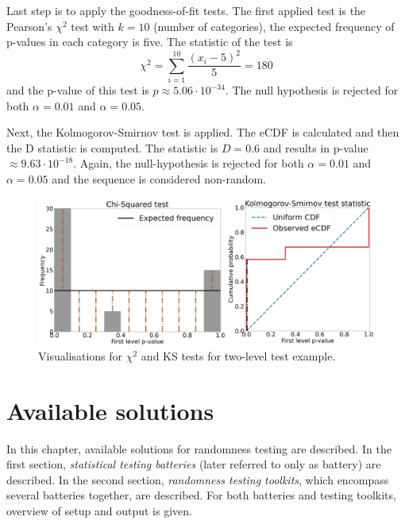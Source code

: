 \documentclass[
  digital,     %
  oneside,     %
  nosansbold,  %
  nocolorbold, %
  nolof,         %
  nolot,         %
]{fithesis4}
\begin{document}
Last step is to apply the goodness-of-fit tests. The first applied test is the Pearson's $\chi^2$ test with $k=10$ (number of categories), the expected frequency of p-values in each category is five. The statistic of the test is
\[\chi^2 = \sum_{i=1}^{10} \dfrac{(x_i - 5)^2}{5} = 180 \]
and the p-value of this test is $p\approx5.06\cdot10^{-34}$. The null hypothesis is rejected for both $\alpha = 0.01$ and $\alpha = 0.05$. 

Next, the Kolmogorov-Smirnov test is applied. The eCDF is calculated and then the D statistic is computed. The statistic is $D = 0.6$ and results in p-value $\approx 9.63\cdot10^{-18}$. Again, the null-hypothesis is rejected for both $\alpha = 0.01$ and $\alpha = 0.05$ and the sequence is considered non-random.

\begin{figure}
  \begin{center}
    \includegraphics[width=12.5cm]{figures/two_example.png}
  \end{center}
  \caption{Visualisations for $\chi^2$ and KS tests for two-level test example.}
  \label{fig:two_example}
\end{figure}



\chapter{Available solutions}
In this chapter, available solutions for randomness testing are described. In the first section, \emph{statistical testing batteries} (later referred to only as battery) are described. In the second section, \emph{randomness testing toolkits}, which encompass several batteries together, are described. For both batteries and testing toolkits, overview of setup and output is given.
\end{document}
